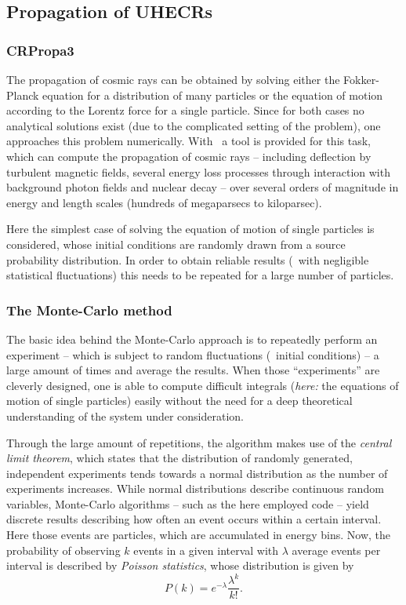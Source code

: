 \subsection{Propagation of UHECRs}
\subsubsection{CRPropa3}
The propagation of cosmic rays can be obtained by solving either the
Fokker-Planck equation for a distribution of many particles
or the equation of motion according to the Lorentz force for a single particle.
Since for both cases no analytical solutions exist (due to the complicated
setting of the problem), one approaches this problem
numerically. With \CRPropa~a tool is provided for this task, which can compute
the propagation of cosmic rays -- including deflection by turbulent magnetic
fields, several energy loss processes through interaction with background
photon fields and nuclear decay -- over several orders of magnitude in energy
and length scales (hundreds of megaparsecs to kiloparsec).

Here the simplest case of solving the equation of motion of single particles is
considered, whose initial conditions are randomly drawn from a source probability
distribution. In order to obtain reliable results (\ie~with negligible
statistical fluctuations) this needs to be repeated for a large number of
particles.


\subsubsection{The Monte-Carlo method}
The basic idea behind the Monte-Carlo approach is to repeatedly perform an
experiment -- which is subject to random fluctuations (\eg~initial
conditions) -- a large amount of times and average the results. When
those \enquote{experiments} are cleverly designed, one is able to compute
difficult integrals (\emph{here:} the equations of motion of single
particles) easily without the need for a deep theoretical understanding of
the system under consideration.

Through the large amount of repetitions, the algorithm makes use of the
\emph{central limit theorem}, which states that the distribution of randomly
generated, independent experiments tends towards a normal distribution as the
number of experiments increases.
While normal distributions describe continuous random variables, Monte-Carlo
algorithms -- such as the here employed code \CRPropa -- yield discrete results
describing how often an event occurs within a certain interval. Here those
events are particles, which are accumulated in energy bins.
Now, the probability of observing $k$ events in a given interval with $\lambda$
average events per interval is described by \emph{Poisson statistics}, whose
distribution is given by
\begin{equation}
    P(k)=e^{-\lambda}\frac{\lambda^k}{k!}.
    \label{eq:poisson}
\end{equation}

